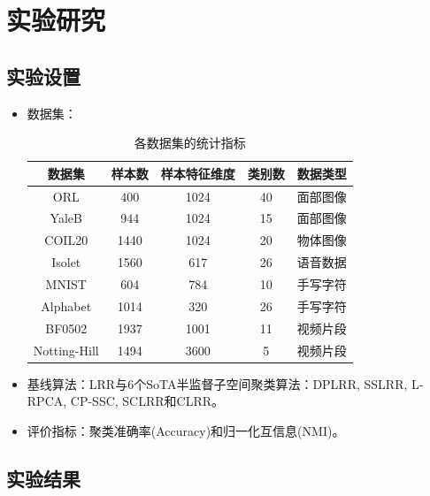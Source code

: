\documentclass{beamer}
\begin{document}
\section{实验研究}

\subsection{实验设置}

\begin{frame}
\begin{itemize}
\item 数据集：

\begin{table}[H]
    \scriptsize
	\renewcommand{\arraystretch}{1.1}
	\caption{各数据集的统计指标}
	\label{table_1}
        \vspace{-0.1cm}
	\centering
	\begin{tabular}{ccccc}
		\hline
		数据集 & 样本数 & 样本特征维度 & 类别数 & 数据类型\\
		\hline
        ORL & 400 & 1024 & 40 & 面部图像\\
        YaleB & 944 & 1024 & 15 & 面部图像\\
        COIL20 & 1440 & 1024 & 20 & 物体图像\\
        Isolet & 1560 & 617 & 26 & 语音数据\\
        MNIST & 604 & 784 & 10 & 手写字符\\
        Alphabet & 1014 & 320 & 26 & 手写字符\\
            BF0502 & 1937 & 1001 & 11 & 视频片段\\
          Notting-Hill & 1494 & 3600 & 5 & 视频片段\\
		\hline
	\end{tabular}
\end{table}

\item 基线算法：LRR与6个SoTA半监督子空间聚类算法：DPLRR, SSLRR, L-RPCA, CP-SSC, SCLRR和CLRR。

\item 评价指标：聚类准确率(Accuracy)和归一化互信息(NMI)。

\end{itemize}
\end{frame}

\subsection{实验结果}
\end{document}
